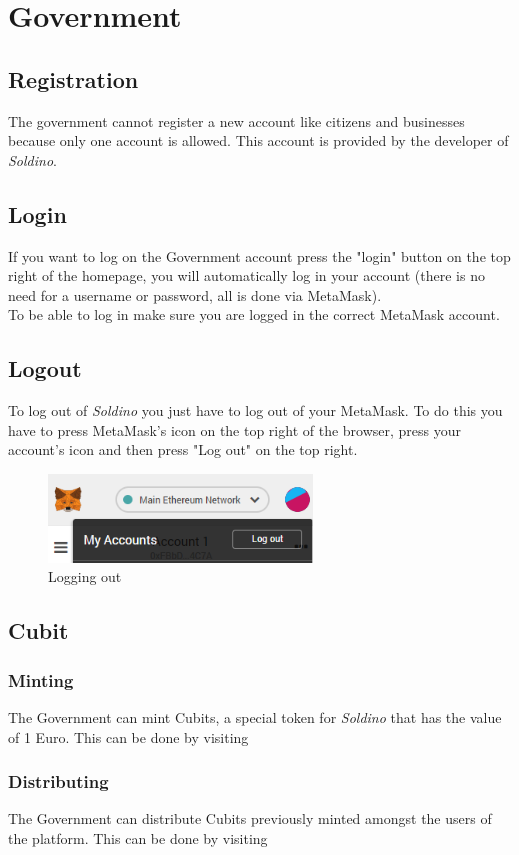 \section{Government}
	\subsection{Registration}
	The government cannot register a new account like citizens and 
	businesses because only one account is allowed. This account is provided 
	by the developer of \textit{Soldino}.
	\subsection{Login}
	If you want to log on the Government account press the "login" button on the 
	top right of the homepage, you will automatically log in your account 
	(there is no need for a username or password, all is done via MetaMask). 
	\\To be able to log in make sure you are logged in the correct MetaMask 
	account.
	\subsection{Logout}
	To log out of \textit{Soldino} you just have to log out of 
	your MetaMask. To do this you have to press MetaMask's icon on the top 
	right of the browser, press your account's icon and then press "Log out"
	on the top right.
	\begin{figure}[H]
		\includegraphics[width=7cm]{res/images/logout_metamask.png}
		\centering
		\caption{Logging out}
	\end{figure}
	\subsection{Cubit}
		\subsubsection{Minting}
		The Government can mint Cubits, a special token for \textit{Soldino} 
		that has the value of 1 Euro. This can be done by visiting 
%		
		\subsubsection{Distributing}
		The Government can distribute Cubits previously minted amongst the users 
		of the platform. This can be done by visiting 
%		
